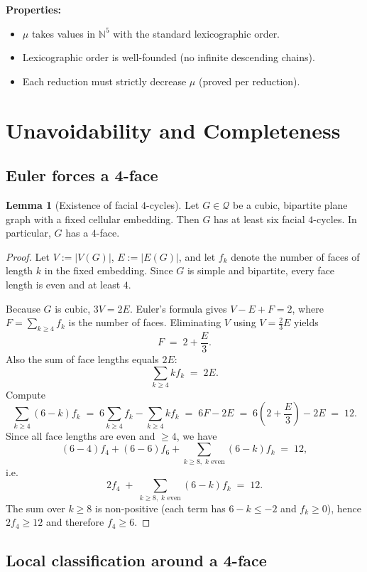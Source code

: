 \documentclass[12pt]{article}
\theoremstyle{definition}
\newtheorem{lemma}[theorem]{Lemma}
\begin{document}
\textbf{Properties:}
\begin{itemize}
    \item $\mu$ takes values in $\mathbb{N}^5$ with the standard lexicographic order.
    \item Lexicographic order is well-founded (no infinite descending chains).
    \item Each reduction must strictly decrease $\mu$ (proved per reduction).
\end{itemize}

\section{Unavoidability and Completeness}
\label{sec:unavoidability}

\subsection{Euler forces a 4-face}
\label{subsec:euler-forces-4face}

\begin{lemma}[Existence of facial $4$-cycles]
\label{lem:existence-f4}
Let $G\in\mathcal Q$ be a cubic, bipartite plane graph with a fixed cellular embedding.
Then $G$ has at least six facial $4$-cycles. In particular, $G$ has a $4$-face.
\end{lemma}

\begin{proof}
Let $V:=|V(G)|$, $E:=|E(G)|$, and let $f_k$ denote the number of faces of length $k$
in the fixed embedding. Since $G$ is simple and bipartite, every face length is even and at least $4$.

Because $G$ is cubic, $3V=2E$.
Euler's formula gives $V-E+F=2$, where $F=\sum_{k\ge 4} f_k$ is the number of faces.
Eliminating $V$ using $V=\frac{2}{3}E$ yields
\[
F \;=\; 2 + \frac{E}{3}.
\]
Also the sum of face lengths equals $2E$:
\[
\sum_{k\ge 4} k f_k \;=\; 2E.
\]
Compute
\[
\sum_{k\ge 4} (6-k) f_k
\;=\;
6\sum_{k\ge 4} f_k - \sum_{k\ge 4} k f_k
\;=\;
6F - 2E
\;=\;
6\left(2+\frac{E}{3}\right) - 2E
\;=\; 12.
\]
Since all face lengths are even and $\ge 4$, we have
\[
(6-4)f_4 + (6-6)f_6 + \sum_{k\ge 8,\; k\text{ even}} (6-k)f_k \;=\; 12,
\]
i.e.
\[
2f_4 \;+\; \sum_{k\ge 8,\; k\text{ even}} (6-k)f_k \;=\; 12.
\]
The sum over $k\ge 8$ is non-positive (each term has $6-k\le -2$ and $f_k\ge 0$), hence
$2f_4\ge 12$ and therefore $f_4\ge 6$.
\end{proof}

\subsection{Local classification around a 4-face}
\label{subsec:local-classification-4face}
\end{document}

